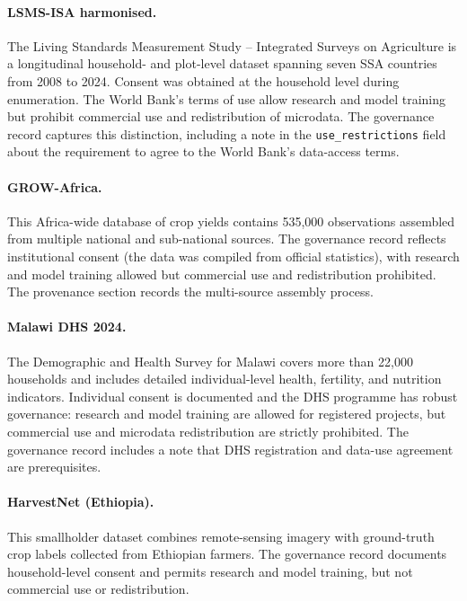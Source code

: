 \documentclass{article}
\begin{document}
\paragraph{LSMS-ISA harmonised.} The Living Standards Measurement Study -- Integrated Surveys on Agriculture \cite{gourlay2025} is a longitudinal household- and plot-level dataset spanning seven SSA countries from 2008 to 2024. Consent was obtained at the household level during enumeration. The World Bank's terms of use allow research and model training but prohibit commercial use and redistribution of microdata. The governance record captures this distinction, including a note in the \texttt{use\_restrictions} field about the requirement to agree to the World Bank's data-access terms.

\paragraph{GROW-Africa.} This Africa-wide database of crop yields \cite{jain2025} contains 535,000 observations assembled from multiple national and sub-national sources. The governance record reflects institutional consent (the data was compiled from official statistics), with research and model training allowed but commercial use and redistribution prohibited. The provenance section records the multi-source assembly process.

\paragraph{Malawi DHS 2024.} The Demographic and Health Survey for Malawi covers more than 22,000 households and includes detailed individual-level health, fertility, and nutrition indicators. Individual consent is documented and the DHS programme has robust governance: research and model training are allowed for registered projects, but commercial use and microdata redistribution are strictly prohibited. The governance record includes a note that DHS registration and data-use agreement are prerequisites.

\paragraph{HarvestNet (Ethiopia).} This smallholder dataset combines remote-sensing imagery with ground-truth crop labels collected from Ethiopian farmers. The governance record documents household-level consent and permits research and model training, but not commercial use or redistribution.
\end{document}

